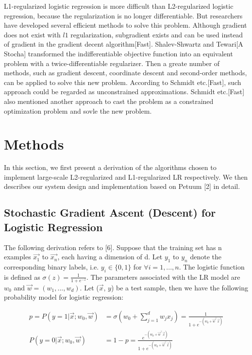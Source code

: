 \documentclass{article} %
\begin{document}
L1-regularized logistic regression is more difficult than L2-regularized logistic regression, because the regularization is no longer differentiable. But researchers have developed several efficient methods to solve this problem. Although gradient does not exist with $l1$ regularization, subgradient exists and can be used instead of gradient in the gradient decent algorithm[Fast]. Shalev-Shwartz and Tewari[A Stocha] transformed the indifferentiable objective function into an equivalent problem with a twice-differentiable regularizer. Then a greate number of methods, such as gradient descent, coordinate descent and second-order methods, can be applied to solve this new problem. According to Schmidt etc.[Fast], such approach could be regarded as unconstrained approximations. Schmidt etc.[Fast] also mentioned another approach to cast the problem as a constrained optimization problem and sovle the new problem.

\section{Methods}
\label{headings}

In this section, we first present a derivation of the algorithms chosen to implement large-scale L2-regularized and L1-regularized LR respectively. We then describes our system design and implementation based on Petuum [2] in detail.

\subsection{Stochastic Gradient Ascent (Descent) for Logistic Regression}

The following derivation refers to [6]. Suppose that the training set has n examples $\vec{x_1}$ to $\vec{x_n}$, each having a dimension of d. Let $y_1$ to $y_n$ denote the corresponding binary labels, i.e. $y_i \in \{0, 1\}$ for $\forall i = 1, ..., n$. The logistic function is defined as $\sigma(z) = \frac{1}{1+e^{-z}}$. The parameters associated with the LR model are $w_0$ and $\vec{w} = (w_1, ..., w_d)$. Let ($\vec{x}$, $y$) be a test sample, then we have the following probability model for logistic regression:

\begin{align*}
    p = P(y=1 | \vec{x}; w_0, \vec{w}) &= \sigma(w_0 + \sum\limits_{j=1}^d w_jx_j) = \frac{1}{1 + e^{-(w_0 + \vec{w}^\top\vec{x})}}\\
    P(y=0 | \vec{x}; w_0, \vec{w}) &= 1 - p = \frac{e^{-(w_0 + \vec{w}^\top\vec{x})}}{1 + e^{-(w_0 + \vec{w}^\top\vec{x})}}
\end{align*}
\end{document}
